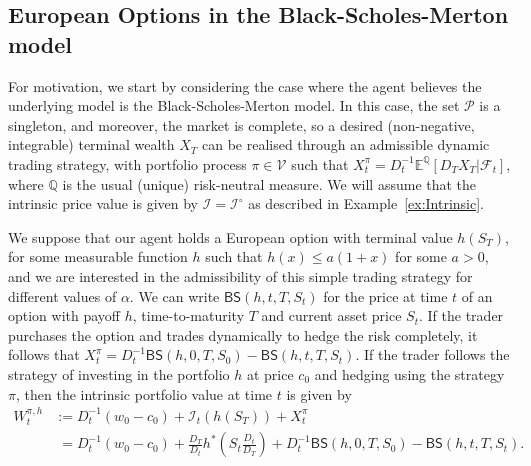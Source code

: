 \documentclass[a4paper]{amsart}
\theoremstyle{definition}
\theoremstyle{remark}
\numberwithin{equation}{section}
\newcommand{\E}{\mathbb{E}}
\newcommand{\Q}{\mathbb{Q}}
\newcommand{\Fc}{\mathcal{F}}
\newcommand{\Eq}[1]{\E^{\Q}\left[#1\right]}
\newcommand{\Pc}{\mathcal{P}}
\newcommand{\Vc}{\mathcal{V}}
\newcommand{\In}{\mathcal{I}} %
\newcommand{\BS}{\mathsf{BS}}
\begin{document}
\subsection{European Options in the Black-Scholes-Merton model}

For motivation, we start by considering the case where the agent believes the underlying model is the Black-Scholes-Merton model. In this case, the set $\Pc$ is a singleton, and moreover, the market is complete, so a desired (non-negative, integrable) terminal wealth $X_T$ can be realised through an admissible dynamic trading strategy, with portfolio process $\pi \in \Vc$ such that $X_t^\pi = D_t^{-1} \Eq{D_T X_T|\Fc_t}$, where $\Q$ is the usual (unique) risk-neutral measure. We will assume that the intrinsic price value is given by $\In = \In^\circ$ as described in Example~\ref{ex:Intrinsic}.


We suppose that our agent holds a European option with terminal value $h(S_T)$, for some measurable function $h$ such that $h(x) \le a(1+x)$ for some $a>0$, and we are interested in the admissibility of this simple trading strategy for different values of $\alpha$. We can write $\BS(h,t,T,S_t)$ for the price at time $t$ of an option with payoff $h$, time-to-maturity $T$ and current asset price $S_t$. If the trader purchases the option and trades dynamically to hedge the risk completely, it follows that $X_t^\pi = D_t^{-1}\BS(h,0,T,S_0) - \BS(h,t,T,S_t)$. If the trader follows the strategy of investing in the portfolio $h$ at price $c_0$ and hedging using the strategy $\pi$, then the intrinsic portfolio value at time $t$ is given by
\begin{align*}
  W_t^{\pi,h} & := D_t^{-1} (w_0-c_0) +  \In_t(h(S_T))  + X_t^{\pi} \\
              & \;= D_t^{-1} (w_0-c_0)  + \frac{D_T}{D_t} h^*\left(S_t \frac{D_t}{D_T}\right) + D_t^{-1}\BS(h,0,T,S_0) - \BS(h,t,T,S_t).
\end{align*}
\end{document}
